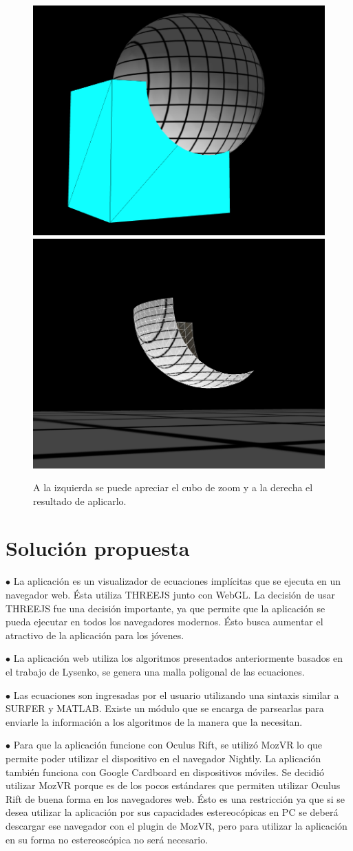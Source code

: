 \documentclass[12pt]{article}
\begin{document}
\begin{figure}[h!]
\includegraphics[width =0.45\linewidth]{cubo1.png}
\hfill
\includegraphics[width =0.45\linewidth]{cubo2.png}
\caption{ A la izquierda se puede apreciar el cubo de zoom y a la derecha el resultado de aplicarlo.}
\label{zoomCube}
\end{figure}
\clearpage

\section{Solución propuesta}
$\bullet$ La aplicación es un visualizador de ecuaciones implícitas que se ejecuta en un navegador web. Ésta utiliza THREEJS junto con WebGL. La decisión de usar THREEJS fue una decisión importante, ya que permite que la aplicación se pueda ejecutar en todos los navegadores modernos. Ésto busca  aumentar el atractivo de la aplicación para los jóvenes.

$\bullet$ La aplicación web utiliza los algoritmos presentados anteriormente basados en el trabajo de Lysenko\cite{mykola1}\cite{mykola2}, se genera una malla poligonal de las ecuaciones.  

$\bullet$ Las ecuaciones son ingresadas por el usuario utilizando una sintaxis similar a SURFER y MATLAB. Existe un módulo que se encarga de parsearlas para enviarle la información a los algoritmos de la manera que la necesitan.

$\bullet$ Para que la aplicación funcione con Oculus Rift, se utilizó MozVR lo que permite poder utilizar el dispositivo en el navegador Nightly. La aplicación también funciona con Google Cardboard en dispositivos móviles. Se decidió utilizar MozVR porque es de los pocos estándares que permiten utilizar Oculus Rift de buena forma en los navegadores web. Ésto es una restricción ya que si se desea utilizar la aplicación por sus capacidades estereocópicas en PC se deberá descargar ese navegador con el plugin de MozVR, pero para utilizar la aplicación en su forma no estereoscópica no será necesario.
\end{document}
